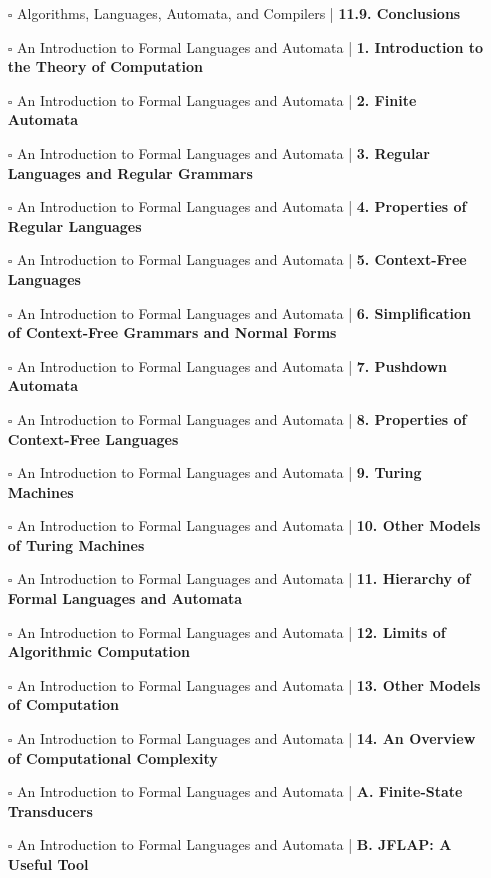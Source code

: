 \documentclass[a4, landscape, 12pt]{article}
\newcommand{\checkbox}{$\square$}%
\begin{document}
\begin{itemize}
{}
\item [\checkbox]  Algorithms, Languages, Automata, and Compilers | \textbf{ 11.9. Conclusions
}
\item [\checkbox]  An Introduction to Formal Languages and Automata | \textbf{ 1. Introduction to the Theory of Computation
}
\item [\checkbox]  An Introduction to Formal Languages and Automata | \textbf{ 2. Finite Automata
}
\item [\checkbox]  An Introduction to Formal Languages and Automata | \textbf{ 3. Regular Languages and Regular Grammars
}
\item [\checkbox]  An Introduction to Formal Languages and Automata | \textbf{ 4. Properties of Regular Languages
}
\item [\checkbox]  An Introduction to Formal Languages and Automata | \textbf{ 5. Context-Free Languages
}
\item [\checkbox]  An Introduction to Formal Languages and Automata | \textbf{ 6. Simplification of Context-Free Grammars and Normal Forms
}
\item [\checkbox]  An Introduction to Formal Languages and Automata | \textbf{ 7. Pushdown Automata
}
\item [\checkbox]  An Introduction to Formal Languages and Automata | \textbf{ 8. Properties of Context-Free Languages
}
\item [\checkbox]  An Introduction to Formal Languages and Automata | \textbf{ 9. Turing Machines
}
\item [\checkbox]  An Introduction to Formal Languages and Automata | \textbf{ 10. Other Models of Turing Machines
}
\item [\checkbox]  An Introduction to Formal Languages and Automata | \textbf{ 11. Hierarchy of Formal Languages and Automata
}
\item [\checkbox]  An Introduction to Formal Languages and Automata | \textbf{ 12. Limits of Algorithmic Computation
}
\item [\checkbox]  An Introduction to Formal Languages and Automata | \textbf{ 13. Other Models of Computation
}
\item [\checkbox]  An Introduction to Formal Languages and Automata | \textbf{ 14. An Overview of Computational Complexity
}
\item [\checkbox]  An Introduction to Formal Languages and Automata | \textbf{ A. Finite-State Transducers
}
\item [\checkbox]  An Introduction to Formal Languages and Automata | \textbf{ B. JFLAP: A Useful Tool
}
\end{itemize}
\end{document}
